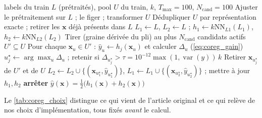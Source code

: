 \begin{algorithm}[htbp]
\caption{COREG tel qu'implémenté dans le notebook 07 (un pli, une cible)}
\label{algo:coreg}
\small
\begin{algorithmic}[1]
\Require labels du train $L$ (prétraités), pool $U$ du train, $k$, $T_{\max}=100$, $N_{\text{cand}}=100$
\State Ajuster le prétraitement sur $L$ ; le figer ; transformer $U$
\State Dédupliquer $U$ par représentation exacte ; retirer les $\bm{x}$ déjà présents dans $L$
\State $L_1 \gets L$, $L_2 \gets L$ ; $h_1 \gets k\text{NN}_{L1}(L_1)$, $h_2 \gets k\text{NN}_{L2}(L_2)$
  \State Tirer (graine dérivée du pli) au plus $N_{\text{cand}}$ candidats actifs $U' \subseteq U$
    \State Pour chaque $\bm{x}_u \in U'$ : $\hat{y}_u \gets h_j(\bm{x}_u)$ et calculer $\Delta_u$ (\cref{eq:coreg_gain})
    \State $u_j^\star \gets \arg\max_u \Delta_u$ ; retenir si $\Delta_{u_j^\star} > \tau = 10^{-12}\max(1, \operatorname{var}(y))\,k$
    \State Retirer $\bm{x}_{u_j^\star}$ de $U'$ et de $U$
  \EndFor
  \State $L_2 \gets L_2 \cup \{(\bm{x}_{u_1^\star}, \hat{y}_{u_1^\star})\}$, $L_1 \gets L_1 \cup \{(\bm{x}_{u_2^\star}, \hat{y}_{u_2^\star})\}$ ; mettre à jour $h_1, h_2$
    \State \textbf{arrêter}
  \EndIf
\EndFor
\State \Return $\hat{y}(\bm{x}) = \frac{1}{2}\bigl(h_1(\bm{x}) + h_2(\bm{x})\bigr)$
\end{algorithmic}
\end{algorithm}

Le \cref{tab:coreg_choix} distingue ce qui vient de l'article original et ce
qui relève de nos choix d'implémentation, tous fixés \emph{avant} le calcul.


